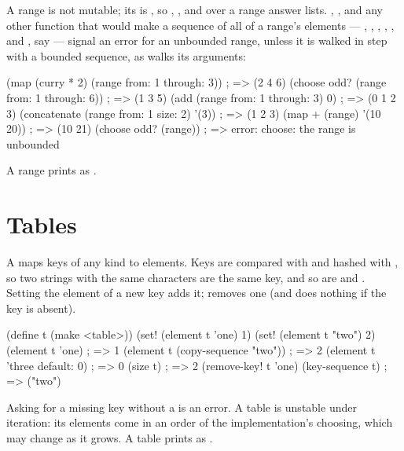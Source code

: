 \noindent A range is not mutable; its  is
, so , ,  and
 over a range answer lists. ,
, and any other function that would make a sequence
of all of a range's elements --- , , ,
, ,  and
, say --- signal an error for an unbounded range, unless it
is walked in step with a bounded sequence, as  walks its
arguments:

\begin{dylan}
(map (curry * 2) (range from: 1 through: 3))   ; => (2 4 6)
(choose odd? (range from: 1 through: 6))       ; => (1 3 5)
(add (range from: 1 through: 3) 0)             ; => (0 1 2 3)
(concatenate (range from: 1 size: 2) '(3))     ; => (1 2 3)
(map + (range) '(10 20))                       ; => (10 21)
(choose odd? (range))     ; => error: choose: the range is unbounded
\end{dylan}

\noindent A range prints as .

\section{Tables}\label{sec:collections-tables}

A  maps keys of any kind to elements. Keys are compared
with \code{=} and hashed with , so two strings with the same
characters are the same key, and so are  and . Setting
the element of a new key adds it;  removes one (and
does nothing if the key is absent).

\begin{dylan}
(define t (make <table>))
(set! (element t 'one) 1)
(set! (element t "two") 2)
(element t 'one)                     ; => 1
(element t (copy-sequence "two"))    ; => 2
(element t 'three default: 0)        ; => 0
(size t)                             ; => 2
(remove-key! t 'one)
(key-sequence t)                     ; => ("two")
\end{dylan}

\noindent Asking for a missing key without a  is an
error. A table is unstable under iteration: its elements come in an
order of the implementation's choosing, which may change as it grows.
A table prints as .

